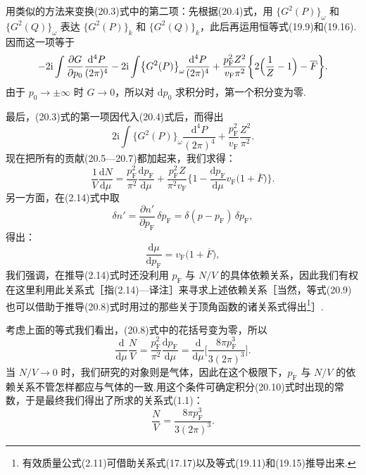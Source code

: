用类似的方法来变换(20.3)式中的第二项：先根据(20.4)式，用 $\{G^2(P)\}_{\omega}$ 和 $\{G^2(Q)\}_{\omega}$ 表达 $\{G^2(P)\}_{k}$ 和 $\{G^2(Q)\}_{k}$，此后再运用恒等式(19.9)和(19.16).因而这一项等于
\begin{equation}
  -2\mathrm{i}\int\frac{\partial G}{\partial p_0}\frac{\mathrm{d}^4P}{(2\pi)^4}
  -2\mathrm{i}\int\bigl\{G^2(P)\bigr\}_{\omega}\frac{\mathrm{d}^4P}{(2\pi)^4}
  +\frac{p_{\mathrm{F}}^2Z^2}{v_{\mathrm{F}}\pi^2}\biggl\{2\Bigl(\frac{1}{Z}-1\Bigr)-\overline{F}\biggr\}.
\end{equation}
由于 $p_0\to\pm\infty$ 时 $G\to0$，所以对 $\mathrm{d}p_0$ 求积分时，第一个积分变为零.

最后，(20.3)式的第一项因代入(20.4)式后，而得出
\begin{equation}
  2\mathrm{i}\int\bigl\{G^2(P)\bigr\}_{\omega}\frac{\mathrm{d}^4P}{(2\pi)^4}+\frac{p_{\mathrm{F}}^2}{v_{\mathrm{F}}}\frac{Z^2}{\pi^2}.
\end{equation}
现在把所有的贡献(20.5—20.7)都加起来，我们求得：
\begin{equation}
  \frac{1}{V}\frac{\mathrm{d}N}{\mathrm{d}\mu}=\frac{p_{\mathrm{F}}^2}{\pi^2}\frac{\mathrm{d}p_{\mathrm{F}}}{\mathrm{d}\mu}
  +\frac{p_{\mathrm{F}}^2Z}{\pi^2v_{\mathrm{F}}}\biggl\{1-\frac{\mathrm{d}p_{\mathrm{F}}}{\mathrm{d}\mu}v_{\mathrm{F}}\bigl(1+\overline{F}\bigr)\biggr\}.
\end{equation}
另一方面，在(2.14)式中取
\begin{equation*}
  \delta n'=\frac{\partial n'}{\partial p_{\mathrm{F}}}\,\delta p_{\mathrm{F}}=\delta(p-p_{\mathrm{F}})\,\delta p_{\mathrm{F}},
\end{equation*}
得出：
\begin{equation}
  \frac{\mathrm{d}\mu}{\mathrm{d}p_{\mathrm{F}}}=v_{\mathrm{F}}\bigl(1+\overline{F}\bigr),
\end{equation}
我们强调，在推导(2.14)式时还没利用 $p_{\mathrm{F}}$ 与 $N/V$ 的具体依赖关系，因此我们有权在这里利用此关系式［指(2.14)—译注］来寻求上述依赖关系［当然，等式(20.9)也可以借助于推导(20.8)式时用过的那些关于顶角函数的诸关系式得出\footnote{有效质量公式(2.11)可借助关系式(17.17)以及等式(19.11)和(19.15)推导出来.}］.

考虑上面的等式我们看出，(20.8)式中的花括号变为零，所以
\begin{equation}
  \frac{\mathrm{d}}{\mathrm{d}\mu}\frac{N}{V}=\frac{p_{\mathrm{F}}^2}{\pi^2}\frac{\mathrm{d}p_{\mathrm{F}}}{\mathrm{d}\mu}
  =\frac{\mathrm{d}}{\mathrm{d}\mu}\biggl[\frac{8\pi p_{\mathrm{F}}^3}{3(2\pi)^3}\biggr].
\end{equation}
当 $N/V\to0$ 时，我们研究的对象则是气体，因此在这个极限下，$p_{\mathrm{F}}$ 与 $N/V$ 的依赖关系不管怎样都应与气体的一致.用这个条件可确定积分(20.10)式时出现的常数，于是最终我们得出了所求的关系式(1.1)：
\begin{equation*}
  \frac{N}{V}=\frac{8\pi p_{\mathrm{F}}^3}{3(2\pi)^3}.
\end{equation*}

